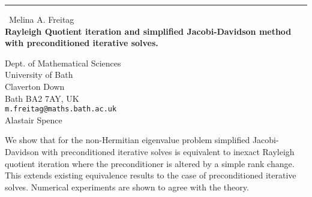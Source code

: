\documentclass{report}
\begin{document}
\begin{center}
\rule{6in}{1pt} \
{\large Melina A. Freitag \\
{\bf Rayleigh Quotient iteration and simplified Jacobi-Davidson method
with preconditioned iterative solves.
}}

 Dept. of Mathematical Sciences\\ 
 University of Bath\\
 Claverton Down \\
 Bath BA2 7AY, UK \\
{\tt m.freitag@maths.bath.ac.uk}\\
Alastair Spence
\end{center}

We show that for the non-Hermitian eigenvalue problem simplified
Jacobi-Davidson with preconditioned iterative solves is equivalent to
inexact Rayleigh quotient iteration where the preconditioner is altered by
a simple rank change. This extends existing equivalence results to the
case of preconditioned iterative solves. Numerical experiments are shown
to agree with the theory.
\end{document}
